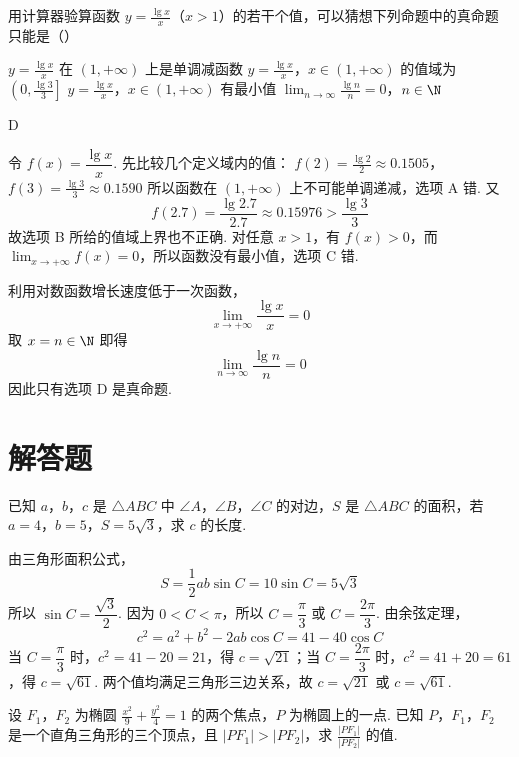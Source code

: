 \begin{problem}
用计算器验算函数 \(y=\frac{\lg x}{x}\)（\(x>1\)）的若干个值，可以猜想下列命题中的真命题只能是（\quad）

\choices
    {\(y=\frac{\lg x}{x}\) 在 \((1,+\infty)\) 上是单调减函数}
    {\(y=\frac{\lg x}{x}\)，\(x\in(1,+\infty)\) 的值域为 \(\left(0,\frac{\lg 3}{3}\right]\)}
    {\(y=\frac{\lg x}{x}\)，\(x\in(1,+\infty)\) 有最小值}
    {\(\displaystyle\lim_{n\to\infty}\frac{\lg n}{n}=0\)，\(n\in\N\)}
\end{problem}

\begin{answer}
D
\end{answer}

\begin{solution}
令 \(f(x)=\dfrac{\lg x}{x}\). 先比较几个定义域内的值：
\(f(2)=\frac{\lg2}{2}\approx0.1505\)，\(f(3)=\frac{\lg3}{3}\approx0.1590\)
所以函数在 \((1,+\infty)\) 上不可能单调递减，选项 A 错. 又
\[
f(2.7)=\frac{\lg2.7}{2.7}\approx0.15976>\frac{\lg3}{3}
\]
故选项 B 所给的值域上界也不正确. 对任意 \(x>1\)，有 \(f(x)>0\)，而 \(\displaystyle\lim_{x\to+\infty}f(x)=0\)，所以函数没有最小值，选项 C 错.

利用对数函数增长速度低于一次函数，
\[
\lim_{x\to+\infty}\frac{\lg x}{x}=0
\]
取 \(x=n\in\N\) 即得
\[
\lim_{n\to\infty}\frac{\lg n}{n}=0
\]
因此只有选项 D 是真命题.
\end{solution}

\section{解答题}
\begin{problem}
已知 \(a\)，\(b\)，\(c\) 是 \(\triangle ABC\) 中 \(\angle A\)，\(\angle B\)，\(\angle C\) 的对边，\(S\) 是 \(\triangle ABC\) 的面积，若 \(a=4\)，\(b=5\)，\(S=5\sqrt{3}\)，求 \(c\) 的长度.
\end{problem}

\begin{solution}
由三角形面积公式，
\[
S=\frac{1}{2}ab\sin C=10\sin C=5\sqrt{3}
\]
所以 \(\sin C=\dfrac{\sqrt{3}}{2}\). 因为 \(0<C<\pi\)，所以 \(C=\dfrac{\pi}{3}\) 或 \(C=\dfrac{2\pi}{3}\). 由余弦定理，
\[
c^2=a^2+b^2-2ab\cos C=41-40\cos C
\]
当 \(C=\dfrac{\pi}{3}\) 时，\(c^2=41-20=21\)，得 \(c=\sqrt{21}\)；当 \(C=\dfrac{2\pi}{3}\) 时，\(c^2=41+20=61\)，得 \(c=\sqrt{61}\). 两个值均满足三角形三边关系，故 \(c=\sqrt{21}\) 或 \(c=\sqrt{61}\).
\end{solution}

\begin{problem}
设 \(F_1\)，\(F_2\) 为椭圆 \(\frac{x^2}{9}+\frac{y^2}{4}=1\) 的两个焦点，\(P\) 为椭圆上的一点. 已知 \(P\)，\(F_1\)，\(F_2\) 是一个直角三角形的三个顶点，且 \(|PF_1|>|PF_2|\)，求 \(\frac{|PF_1|}{|PF_2|}\) 的值.
\end{problem}

